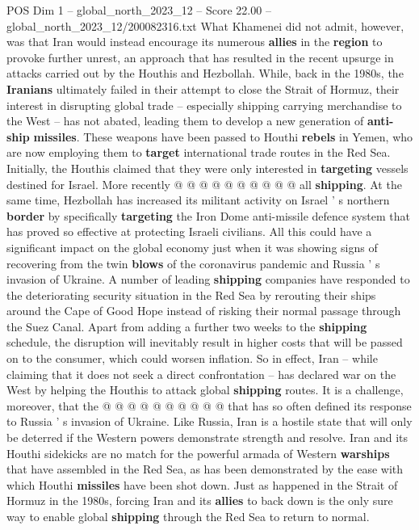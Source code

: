 \begin{textsample}{POS Dim 1 – global\_north\_2023\_12 – Score 22.00 – global\_north\_2023\_12/200082316.txt}
What Khamenei did not admit, however, was that Iran would instead encourage its numerous \textbf{allies} in the \textbf{region} to provoke further unrest, an approach that has resulted in the recent upsurge in attacks carried out by the Houthis and Hezbollah.
While, back in the 1980s, the \textbf{Iranians} ultimately failed in their attempt to close the Strait of Hormuz, their interest in disrupting global trade -- especially shipping carrying merchandise to the West -- has not abated, leading them to develop a new generation of \textbf{anti-ship} \textbf{missiles}.
These weapons have been passed to Houthi \textbf{rebels} in Yemen, who are now employing them to \textbf{target} international trade routes in the Red Sea.
Initially, the Houthis claimed that they were only interested in \textbf{targeting} vessels destined for Israel.
More recently @ @ @ @ @ @ @ @ @ @ all \textbf{shipping}.
At the same time, Hezbollah has increased its militant activity on Israel ' s northern \textbf{border} by specifically \textbf{targeting} the Iron Dome anti-missile defence system that has proved so effective at protecting Israeli civilians.
All this could have a significant impact on the global economy just when it was showing signs of recovering from the twin \textbf{blows} of the coronavirus pandemic and Russia ' s invasion of Ukraine.
A number of leading \textbf{shipping} companies have responded to the deteriorating security situation in the Red Sea by rerouting their ships around the Cape of Good Hope instead of risking their normal passage through the Suez Canal.
Apart from adding a further two weeks to the \textbf{shipping} schedule, the disruption will inevitably result in higher costs that will be passed on to the consumer, which could worsen inflation.
So in effect, Iran -- while claiming that it does not seek a direct confrontation -- has declared war on the West by helping the Houthis to attack global \textbf{shipping} routes.
It is a challenge, moreover, that the @ @ @ @ @ @ @ @ @ @ that has so often defined its response to Russia ' s invasion of Ukraine.
Like Russia, Iran is a hostile state that will only be deterred if the Western powers demonstrate strength and resolve.
Iran and its Houthi sidekicks are no match for the powerful armada of Western \textbf{warships} that have assembled in the Red Sea, as has been demonstrated by the ease with which Houthi \textbf{missiles} have been shot down.
Just as happened in the Strait of Hormuz in the 1980s, forcing Iran and its \textbf{allies} to back down is the only sure way to enable global \textbf{shipping} through the Red Sea to return to normal.

\end{textsample}
